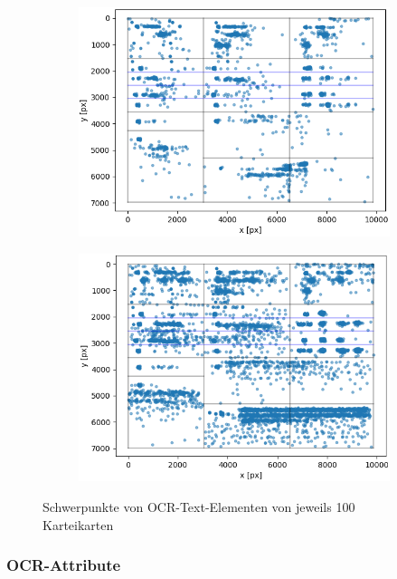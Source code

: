 \begin{figure}[H]
\centering
	\begin{subfigure}[t]{0.47\textwidth}
	\centering
		\includegraphics[scale=0.5]{Bilder/scatter_v1_final.png}
	\end{subfigure}
	\begin{subfigure}[t]{0.47\textwidth}
	\centering
		\includegraphics[scale=0.5]{Bilder/scatter_v2_final.png}
	\end{subfigure}
\caption{Schwerpunkte von OCR-Text-Elementen von jeweils 100 Karteikarten}
\end{figure}


\subsubsection{OCR-Attribute}
\vspace*{-0.3cm}

